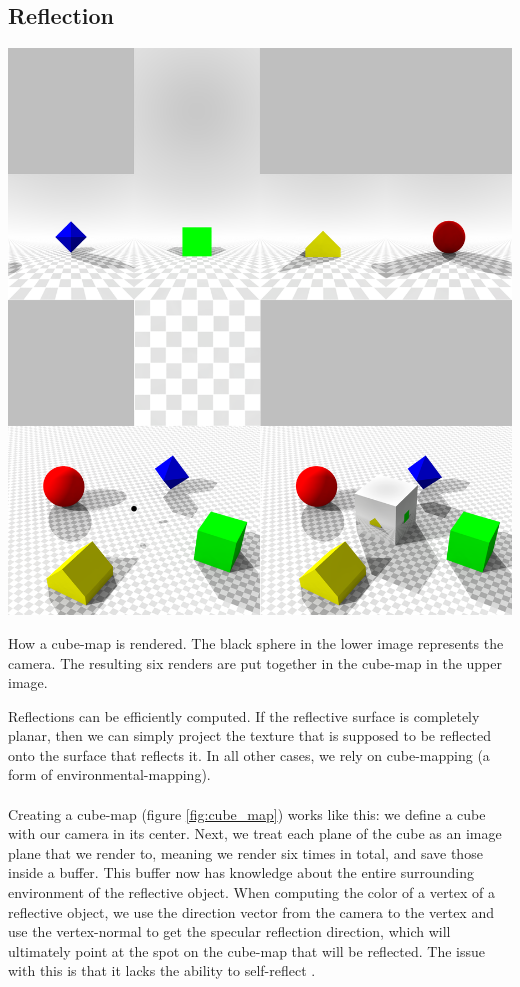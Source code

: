\documentclass{ACGSeminar}
\begin{document}
	\subsection{Reflection} \label{sec:reflection}
		\begin{floatingfigure}[r]{.7\textwidth}%
			\includegraphics[width=.7\textwidth]{img/cube_map.png}
			\caption{How a cube-map is rendered. The black sphere in the lower image represents the camera. The resulting six renders are put together in the cube-map in the upper image.}%
			\label{fig:cube_map}%
		\end{floatingfigure}%
		Reflections can be efficiently computed. If the reflective surface is completely planar, then we can simply project the texture that is supposed to be reflected onto the surface that reflects it. In all other cases, we rely on cube-mapping (a form of environmental-mapping). \\\\
		Creating a cube-map (figure \ref{fig:cube_map}) works like this: we define a cube with our camera in its center. Next, we treat each plane of the cube as an image plane that we render to, meaning we render six times in total, and save those inside a buffer. This buffer now has knowledge about the entire surrounding environment of the reflective object. When computing the color of a vertex of a reflective object, we use the direction vector from the camera to the vertex and use the vertex-normal to get the specular reflection direction, which will ultimately point at the spot on the cube-map that will be reflected. The issue with this is that it lacks the ability to self-reflect \cite{REFL}.
\end{document}
